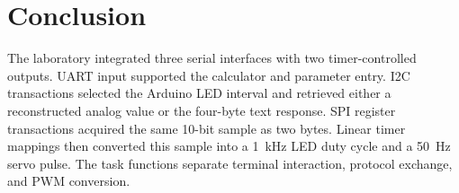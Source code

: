 \documentclass[11pt,a4paper]{article}
\begin{document}
\section{Conclusion}

The laboratory integrated three serial interfaces with two timer-controlled outputs. UART input supported the calculator and parameter entry. I2C transactions selected the Arduino LED interval and retrieved either a reconstructed analog value or the four-byte text response. SPI register transactions acquired the same 10-bit sample as two bytes. Linear timer mappings then converted this sample into a \SI{1}{\kilo\hertz} LED duty cycle and a \SI{50}{\hertz} servo pulse. The task functions separate terminal interaction, protocol exchange, and PWM conversion.
\end{document}
